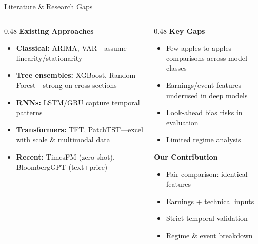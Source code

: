 \documentclass[aspectratio=169,xcolor={dvipsnames}]{beamer}
\begin{document}
\begin{frame}{Literature \& Research Gaps}
  \begin{columns}[T]
    \begin{column}{0.48\textwidth}
      \textbf{Existing Approaches}
      \begin{itemize}\small
        \item \textbf{Classical:} ARIMA, VAR—assume linearity/stationarity
        \item \textbf{Tree ensembles:} XGBoost, Random Forest—strong on cross-sections
        \item \textbf{RNNs:} LSTM/GRU capture temporal patterns
        \item \textbf{Transformers:} TFT, PatchTST—excel with scale \& multimodal data
        \item \textbf{Recent:} TimesFM (zero-shot), BloombergGPT (text+price)
      \end{itemize}
    \end{column}
    
    \begin{column}{0.48\textwidth}
      \textbf{Key Gaps}
      \begin{itemize}\small
        \item Few apples-to-apples comparisons across model classes
        \item Earnings/event features underused in deep models
        \item Look-ahead bias risks in evaluation
        \item Limited regime analysis
      \end{itemize}
      
      \vspace{0.3cm}
      
      \textbf{Our Contribution}
      \begin{itemize}\small
        \item Fair comparison: identical features
        \item Earnings + technical inputs
        \item Strict temporal validation
        \item Regime \& event breakdown
      \end{itemize}
    \end{column}
  \end{columns}
\end{frame}

\end{document}
